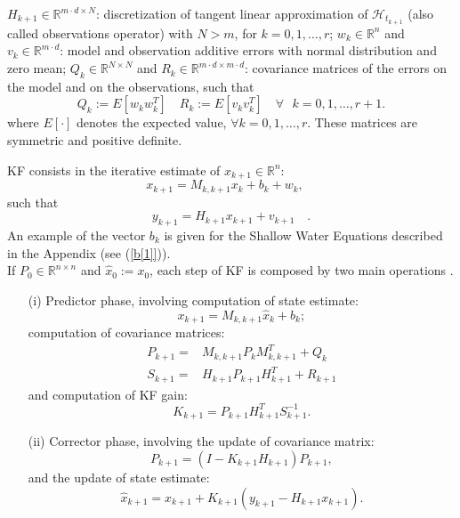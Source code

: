 \documentclass[smallcondensed]{svjour3}
\begin{document}
$H_{k+1}\in \mathbb{R}^{m\cdot d \times N}$:   discretization of tangent linear approximation of $\mathcal{H}_{t_{k+1}}$ (also called observations operator)  with $N>m$, for $k=0,1,\ldots,r$;
$w_{k}\in \mathbb{R}^{n}$ and $v_{k}\in \mathbb{R}^{m\cdot d}$: model and observation additive errors with normal distribution and zero mean;
$Q_{k}\in \mathbb{R}^{N\times N}$ and $R_{k}\in \mathbb{R}^{m\cdot d \times m\cdot d}$: covariance matrices of the errors on the model and on the observations, such that 
\begin{equation}
Q_{k}:=E[w_{k}w_{k}^{T}] \quad R_{k}:=E[v_{k}v_{k}^{T}] \quad \textit{$\forall$ $k=0,1,\ldots,r+1$}.
\end{equation}
\noindent where $E[\cdot]$ denotes the expected value, $\forall k=0,1,\ldots,r$.  These matrices are symmetric and positive definite.

\noindent KF consists in the iterative  estimate  of  $x_{k+1}\in \mathbb{R}^{n}$:
\begin{equation}\label{sistema_kalmandiscreto}
x_{k+1}=M_{k,k+1}x_{k}+b_{k}+w_{k}, \quad 
\end{equation}
such that 
\begin{equation}\label{problema1}
y_{k+1}=H_{k+1}{x}_{k+1}+v_{k+1}\quad .
\end{equation}
An example of the vector $b_k$ is given for the Shallow Water Equations described in the Appendix (see (\ref{b[1]})).\\

\noindent  
If $P_{0}\in \mathbb{R}^{n\times n}$ and  $\widehat{x}_{0}:= x_{0}$, each step of  KF  is composed by two main operations \cite{sorenson}.
\begin{itemize}
\item[(i)] Predictor phase, involving computation of  state estimate:
\begin{equation}\label{stimapredetta}
x_{k+1}=M_{k,k+1}\widehat{x}_{k}+b_{k};
 \end{equation}
computation of  covariance matrices: 
\begin{eqnarray}\label{predictedmatrix}
P_{k+1}=&M_{k,k+1}P_{k}M_{k,k+1}^{T}+Q_{k}\\ \nonumber
S_{k+1}=&H_{k+1}P_{k+1}H_{k+1}^{T}+R_{k+1} 
\end{eqnarray}
and computation of   KF gain:
\begin{equation}\label{guadagnodikalman}
K_{k+1}=P_{k+1}H_{k+1}^{T}S_{k+1}^{-1}.
\end{equation}
\item[(ii)] Corrector phase, involving 
the update of covariance matrix:
\begin{equation}\label{updateP}
P_{k+1}=(I-K_{k+1}H_{k+1})P_{k+1},
\end{equation}
and the update of  state estimate:
\begin{equation}\label{stimapredetta1}
\widehat{x}_{k+1}=x_{k+1}+K_{k+1}(y_{k+1}-H_{k+1}x_{k+1}).
\end{equation}
\end{itemize}
\end{document}
